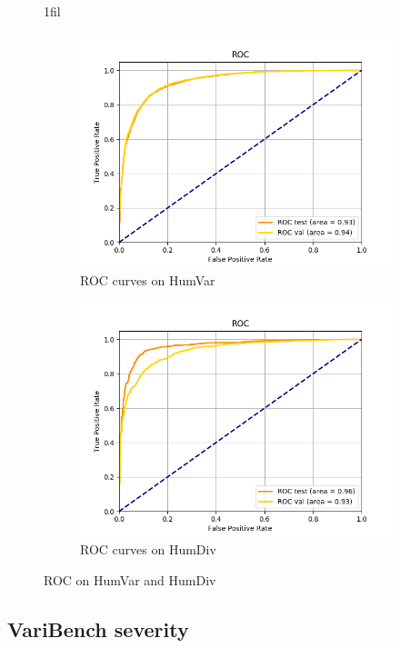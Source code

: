 \documentclass[11pt]{article}
\makeatletter
\newcommand*{\centerfloat}{%
  \parindent \z@
  \leftskip \z@ \@plus 1fil \@minus \textwidth
  \rightskip\leftskip
  \parfillskip \z@skip}
\makeatother
\begin{document}
\begin{figure}
\centerfloat
\begin{subfigure}{.8\textwidth}
  \centering
  \includegraphics[width=.9\linewidth]{humvar_ROC.png}
  \caption{ROC curves on HumVar}
  \label{fig:sub1_h}
\end{subfigure}%
\begin{subfigure}{.8\textwidth}
  \centering
  \includegraphics[width=.9\linewidth]{humdiv_ROC.png}
  \caption{ROC curves on HumDiv}
  \label{fig:sub2_h}
\end{subfigure}
\caption{ROC on HumVar and HumDiv}
\label{fig:hum_rocs}
\end{figure}


\clearpage
\subsection{VariBench severity}
\end{document}
